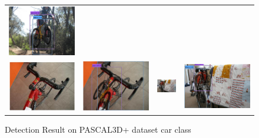 \documentclass[10pt,twocolumn,letterpaper]{article}
\begin{document}
\begin{figure}[h]
\begin{tabular}{|cc|cc|}
  \includegraphics[width=0.22\linewidth]{supp/pas_bicycle17b.png}  \\ 
  \includegraphics[width=0.22\linewidth]{supp/pas_bicycle18a.png} &
  \includegraphics[width=0.22\linewidth]{supp/pas_bicycle18b.png} & 
  \includegraphics[width=0.22\linewidth]{supp/pas_bicycle19a.png}  &
  \includegraphics[width=0.22\linewidth]{supp/pas_bicycle19b.png}  \\   \hline
  \end{tabular}
\caption{Detection Result on PASCAL3D+ dataset car class}%
  \label{fig:pascal3d_bicycle_bad}
\end{figure}


\clearpage
\clearpage
{\small


}
\end{document}
